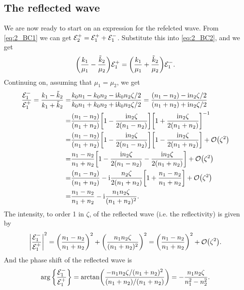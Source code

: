 \documentclass[11pt,letter, swedish, english
]{article}
\begin{document}
\subsection{The reflected wave}
We are now ready to start on an expression for the refelcted wave. 
From \eqref{eq:2_BC1} we can get ${\mathcal{E}_2^+}={\mathcal{E}_1^+}+{\mathcal{E}_1^-}$. Substitute this into
\eqref{eq:2_BC2}, and we get
\begin{equation}
\qty(\frac{k_1}{\mu_1} - \frac{\tilde{k}_2}{\mu_2}){\mathcal{E}_1^+} 
=\qty(\frac{k_1}{\mu_1} + \frac{\tilde{k}_2}{\mu_2}){\mathcal{E}_1^-}.
\end{equation}
Continuing on, assuming that $\mu_1=\mu_2$, we get
\begin{equation}
\begin{aligned}
\frac{\Em}{\Ep} 
= \frac{k_1-\kt_2}{k_1+\kt_2}
=& \frac{k_0n_1 - k_0n_2 - \ii k_0n_2\zeta/2}
{k_0n_1 + k_0n_2 + \ii k_0n_2\zeta/2}
= \frac{(n_1-n_2) - \ii n_2\zeta/2}
{(n_1+n_2) + \ii n_2\zeta/2}\\
=&\frac{(n_1-n_2)}{(n_1+n_2)}
\qty[1-\frac{\ii n_2\zeta}{2(n_1-n_2)}]
\qty[1+\frac{\ii n_2\zeta}{2(n_1+n_2)}]^{-1}\\
=&\frac{(n_1-n_2)}{(n_1+n_2)}
\qty[1-\frac{\ii n_2\zeta}{2(n_1-n_2)}]
\qty[1-\frac{\ii n_2\zeta}{2(n_1+n_2)}] +\order{\zeta^2}\\
=&\frac{n_1-n_2}{n_1+n_2}
\qty[1-\frac{\ii n_2\zeta}{2(n_1-n_2)}
-\frac{\ii n_2\zeta}{2(n_1+n_2)}] +\order{\zeta^2}\\
=&\frac{(n_1-n_2)}{(n_1+n_2)}
-\ii\frac{n_2\zeta}{2(n_1+n_2)}
\qty[1+\frac{n_1-n_2}{n_1+n_2}]+\order{\zeta^2}\\
=&\frac{n_1-n_2}{n_1+n_2}
-\ii\frac{n_1n_2\zeta}{(n_1+n_2)^2}.
\end{aligned}
\end{equation}
The intensity, to order 1 in $\zeta$, of the reflected wave (i.e. the
reflectivity) is given by
\begin{equation}
\abs{\frac{\Em}{\Ep}}^2 
= \qty(\frac{n_1-n_2}{n_1+n_2})^2
+\qty(\frac{n_1n_2\zeta}{(n_1+n_2)^2})^2
=\qty(\frac{n_1-n_2}{n_1+n_2})^2 + \order{\zeta^2}.
\end{equation}
And the phase shift of the reflected wave is
\begin{equation}
\arg\qty{\frac{{\mathcal{E}_1^-}}{{\mathcal{E}_1^+}}} 
= \arctan(\frac{-n_1n_2\zeta/(n_1+n_2)^2}{(n_1+n_2)/(n_1+n_2)})
= -\frac{n_1n_2\zeta}{n_1^2-n_2^2}.
\end{equation}
\end{document}

